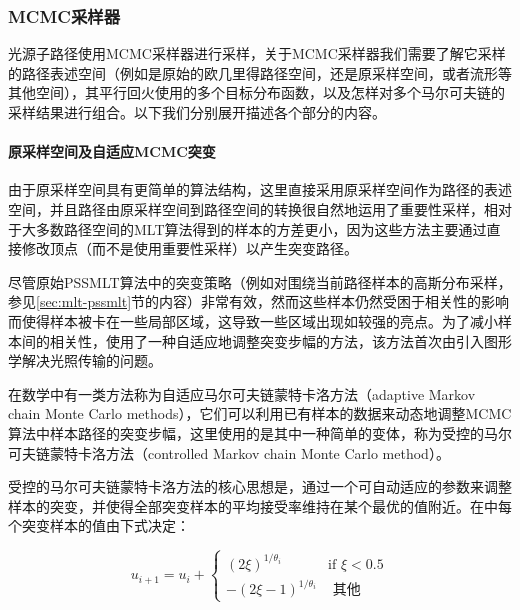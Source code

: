 \subsubsection{MCMC采样器}\label{sec:mlt-mcmc-sampler}
光源子路径使用MCMC采样器进行采样，关于MCMC采样器我们需要了解它采样的路径表述空间（例如是原始的欧几里得路径空间，还是原采样空间，或者流形等其他空间），其平行回火使用的多个目标分布函数，以及怎样对多个马尔可夫链的采样结果进行组合。以下我们分别展开描述各个部分的内容。




\paragraph{原采样空间及自适应MCMC突变}
由于原采样空间具有更简单的算法结构，这里直接采用原采样空间作为路径的表述空间，并且路径由原采样空间到路径空间的转换很自然地运用了重要性采样，相对于大多数路径空间的MLT算法得到的样本的方差更小，因为这些方法主要通过直接修改顶点（而不是使用重要性采样）以产生突变路径。

尽管原始PSSMLT算法中的突变策略（例如对围绕当前路径样本的高斯分布采样，参见\ref{sec:mlt-pssmlt}节的内容）非常有效，然而这些样本仍然受困于相关性的影响而使得样本被卡在一些局部区域，这导致一些区域出现如较强的亮点。为了减小样本间的相关性，\cite{a:RobustLightTransportSimulationviaMetropolisedBidirectionalEstimators}使用了一种自适应地调整突变步幅的方法，该方法首次由\cite{a:RobustAdaptivePhotonTracingusingPhotonPathVisibility}引入图形学解决光照传输的问题。

在数学中有一类方法称为自适应马尔可夫链蒙特卡洛方法（adaptive Markov chain Monte Carlo methods）\cite{a:AtutorialonadaptiveMCMC}，它们可以利用已有样本的数据来动态地调整MCMC算法中样本路径的突变步幅，这里使用的是其中一种简单的变体，称为受控的马尔可夫链蒙特卡洛方法（controlled Markov chain Monte Carlo method）\cite{a:Controlledmcmcforoptimalsampling}。

受控的马尔可夫链蒙特卡洛方法的核心思想是，通过一个可自动适应的参数来调整样本的突变，并使得全部突变样本的平均接受率维持在某个最优的值附近。在\cite{a:RobustLightTransportSimulationviaMetropolisedBidirectionalEstimators}中每个突变样本的值由下式决定：

\begin{equation}
	u_{i+1}=u_i+\begin{cases}
		(2\xi)^{1/\theta_i} & \text{if } \xi<0.5 \\
		-(2\xi-1)^{1/\theta_i} & \text{ 其他}
	\end{cases}
\end{equation}

